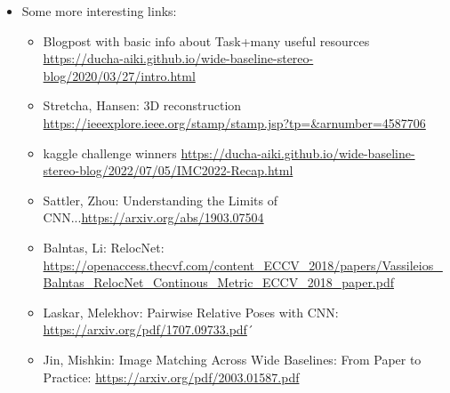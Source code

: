 \documentclass{article}
\begin{document}
\begin{itemize}
\item Some more interesting links:
\begin{itemize}
\item Blogpost with basic info about Task+many useful resources \url{https://ducha-aiki.github.io/wide-baseline-stereo-blog/2020/03/27/intro.html}
\item Stretcha, Hansen: 3D reconstruction \url{https://ieeexplore.ieee.org/stamp/stamp.jsp?tp=&arnumber=4587706}
\item kaggle challenge winners \url{https://ducha-aiki.github.io/wide-baseline-stereo-blog/2022/07/05/IMC2022-Recap.html}
\item Sattler, Zhou: Understanding the Limits of CNN...\url{https://arxiv.org/abs/1903.07504}
\item Balntas, Li: RelocNet: \url{https://openaccess.thecvf.com/content_ECCV_2018/papers/Vassileios_Balntas_RelocNet_Continous_Metric_ECCV_2018_paper.pdf}
\item Laskar, Melekhov: Pairwise Relative Poses with CNN: \url{https://arxiv.org/pdf/1707.09733.pdf}´
\item Jin, Mishkin: Image Matching Across Wide Baselines: From Paper to Practice: \url{https://arxiv.org/pdf/2003.01587.pdf}
\end{itemize}

\end{itemize}
\end{document}
